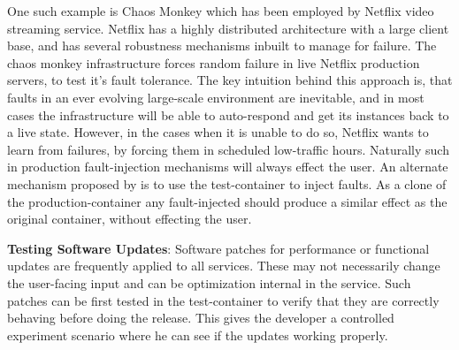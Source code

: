 One such example is Chaos Monkey\cite{chaosmonkey} which has been employed by Netflix \cite{netflix} video streaming service. 
Netflix has a highly distributed architecture with a large client base, and has several robustness mechanisms inbuilt to manage for failure. 
The chaos monkey infrastructure forces random failure in live Netflix production servers, to test it's fault tolerance.
The key intuition behind this approach is, that faults in an ever evolving large-scale environment are inevitable, and in most cases the infrastructure will be able to auto-respond and get its instances back to a live state. 
However, in the cases when it is unable to do so, Netflix wants to learn from failures, by forcing them in scheduled low-traffic hours.
Naturally such in production fault-injection mechanisms will always effect the user. 
An alternate mechanism proposed by \parikshan is to use the test-container to inject faults. 
As a clone of the production-container any fault-injected should produce a similar effect as the original container, without effecting the user.\\
\fi

\textbf{Testing Software Updates}: 
 Software patches for performance or functional updates are frequently applied to all services. 
These may not necessarily change the user-facing input and can be optimization internal in the service.
Such patches can be first tested in the test-container to verify that they are correctly behaving before doing the release.
This gives the developer a controlled experiment scenario where he can see if the updates working properly.



